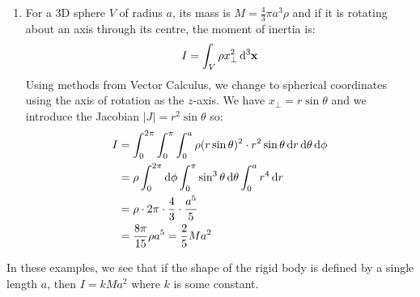 \documentclass[../main.tex]{subfiles}
\begin{document}
\begin{example}
\begin{enumerate}
\begin{center}
\begin{tikzpicture}[>=stealth]
      \end{tikzpicture}
      \end{center}
      Its mass is:
      \[
        M = \pi a^2 \rho
      \]
      and if it is rotating through its centre, the moment of inertia is:
      \[
        I = \int_{D} \rho x^2_\perp \d^2{\vec{x}}
      \]
      Using methods from Vector Calculus, we change to plane polar coordinates on the disc.
      We have $x_{\perp} = r$ and we introduce the Jacobian $|J| = r$ so:
      \begin{align*}
        I &= \int_{0}^{2\pi} \int_{0}^{a} \rho r^2 \cdot r\d{r} \d{\theta} \\
          &= \rho \int_{0}^{2\pi} \d{\pi} \int_{0}^{a} r^3 \d{r} \\
          &= \frac{\pi}{2}\rho a^4 = \frac{1}{2}Ma^2
      \end{align*}
    \item For a 3D sphere $V$ of radius $a$, its mass is $M = \frac{4}{3} \pi a^3 \rho$ and if it is rotating about an axis through its centre, the moment of inertia is:
      \[
        I = \int_{V} \rho x^2_\perp \d^3{\vec{x}}
      \]
      Using methods from Vector Calculus, we change to spherical coordinates using the axis of rotation as the $z$-axis.
      We have $x_{\perp} = r \sin \theta$ and we introduce the Jacobian $|J| = r^2 \sin \theta$ so:
      \begin{align*}
        I &= \int_{0}^{2\pi} \int_{0}^{\pi} \int_{0}^{a} \rho(r \sin \theta)^2 \cdot r^2 \sin \theta \d{r} \d{\theta} \d{\phi} \\
          &= \rho\int_{0}^{2\pi} \d{\phi} \int_{0}^{\pi} \sin^3 \theta \d{\theta} \int_{0}^{a} r^4 \d{r} \\
          &= \rho \cdot 2 \pi \cdot \frac{4}{3} \cdot \frac{a^5}{5} \\
          &= \frac{8\pi}{15} \rho a^5 = \frac{2}{5}Ma^2
      \end{align*}
  \end{enumerate}
\end{example}
\begin{remark}
  In these examples, we see that if the shape of the rigid body is defined by a single length $a$, then $I = kMa^2$ where $k$ is some constant.
\end{remark}
\end{document}
